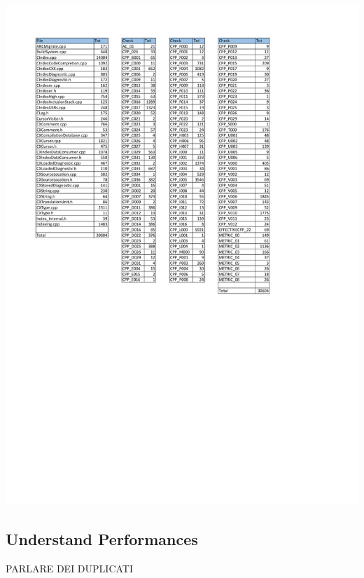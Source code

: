 \begin{minipage}{\linewidth}
	\includegraphics[width=\textwidth]{pdf/AllChecks_Summary.pdf}
\end{minipage}

\subsection{Understand Performances}

PARLARE DEI DUPLICATI